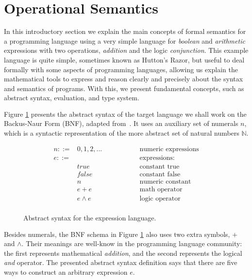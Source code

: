 \documentclass[tese,capa,english]{texufpel}
\begin{document}
\section{Operational Semantics}
\label{sec:opsem}

In this introductory section we explain the main concepts of formal semantics for a programming language using a very simple language for \emph{boolean} and \emph{arithmetic} expressions with two operations, \emph{addition} and the logic \emph{conjunction}. This example language is quite simple, sometimes known as Hutton's Razor, but useful to deal formally with some aspects of programming languages, allowing us explain the mathematical tools to express and reason clearly and precisely about the syntax and semantics of programs. With this, we present fundamental concepts, such as abstract syntax, evaluation, and type system.

Figure \ref{fig:synintro} presents the abstract syntax of the target language we shall work on the Backus-Naur Form (BNF), adapted from~\cite{Pierce:2002:TPL:509043}. It uses an auxiliary set of numerals $n$, which is a syntactic representation of the more abstract set of natural numbers $\mathbb{N}$. 

\begin{figure}[!htb]
\[
\begin{array}{llr}
  n ::= & 0, 1, 2, ... & \textrm{numeric expressions} \\    
  e ::= & \ \ \ \ \ \ \ \ \ \ \ \ \ \ \ \ \ \ \ \ \ \ \ \ \ \ \ \ \ \ \ \ \ \ \ \ \ \  & \textrm{expressions: } \\
        & true & \textrm{constant true} \\
        & false & \textrm{constant false} \\
        & n & \textrm{numeric constant} \\
        & e + e & \textrm{math operator} \\
        & e \wedge e & \textrm{logic operator} \\
\end{array}
\]
\caption{Abstract syntax for the expression language.}
\label{fig:synintro}
\end{figure}

Besides numerals, the BNF schema in Figure \ref{fig:synintro} also uses two extra symbols, $+$ and $\wedge$. Their meanings are well-know in the programming language community: the first represents mathematical \emph{addition}, and the second represents the logical \emph{and} operator. The presented abstract syntax definition says that there are five ways to construct an arbitrary expression $e$.
\end{document}
